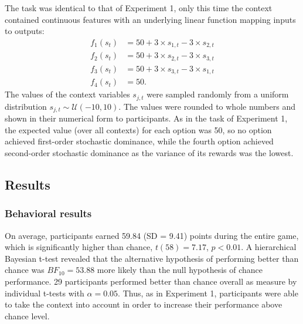 \documentclass[a4paper,natbib]{apa6}
\begin{document}
The task was identical to that of Experiment 1, only this time the context contained continuous features with an underlying linear function mapping inputs to outputs:
%
\begin{align*}
f_1(s_t) &= 50+3\times s_{1,t} - 3\times s_{2,t}\\
f_2(s_t) &= 50+3\times s_{2,t} - 3\times s_{3,t}\\
f_3(s_t) &= 50+3\times s_{3,t} - 3\times s_{1,t}\\
f_4(s_t) &= 50 .
\end{align*}
%
The values of the context variables $s_{j,t}$ were sampled randomly from a uniform distribution $s_{j,t} \sim \mathcal{U}(-10,10)$. The values were rounded to whole numbers and shown in their numerical form to participants. As in the task of Experiment 1, the expected value (over all contexts) for each option was 50, so no option achieved first-order stochastic dominance, while the fourth option achieved second-order stochastic dominance as the variance of its rewards was the lowest.

\subsection{Results}

\subsubsection{Behavioral results}

On average, participants earned 59.84 (SD = 9.41) points during the entire game, which is significantly higher than chance, $t(58)=7.17$, $p<0.01$. A hierarchical Bayesian t-test revealed that the alternative hypothesis of performing better than chance was $BF_{10}= 53.88$ more likely than the null hypothesis of chance performance. 29 participants performed better than chance overall as measure by individual t-tests with $\alpha=0.05$. Thus, as in Experiment 1, participants were able to take the context into account in order to increase their performance above chance level.
\end{document}
